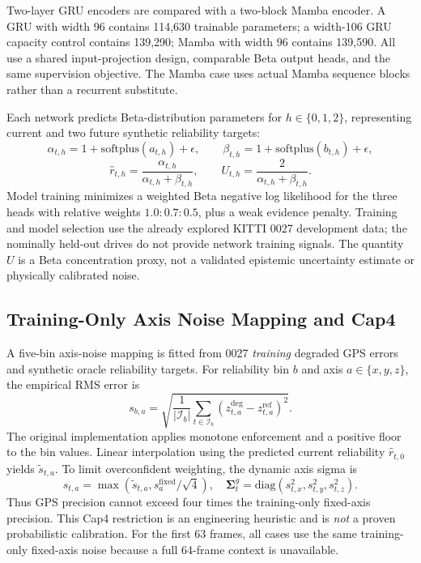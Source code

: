 Two-layer GRU encoders are compared with a two-block Mamba encoder.
A GRU with width 96 contains 114,630 trainable parameters;
a width-106 GRU capacity control contains 139,290; Mamba with
width 96 contains 139,590. All use a shared input-projection
design, comparable Beta output heads, and the same supervision
objective. The Mamba case uses actual Mamba sequence blocks
rather than a recurrent substitute.

Each network predicts Beta-distribution parameters for
$h\in\{0,1,2\}$, representing current and two future
synthetic reliability targets:
\begin{equation}
\alpha_{t,h}=1+\mathrm{softplus}(a_{t,h})+\epsilon,\qquad
\beta_{t,h}=1+\mathrm{softplus}(b_{t,h})+\epsilon,
\end{equation}
\begin{equation}
\hat r_{t,h}=
\frac{\alpha_{t,h}}{\alpha_{t,h}+\beta_{t,h}},\qquad
U_{t,h}=\frac{2}{\alpha_{t,h}+\beta_{t,h}}.
\label{eq:v7_reliability}
\end{equation}
Model training minimizes a weighted Beta negative log likelihood
for the three heads with relative weights $1.0:0.7:0.5$, plus
a weak evidence penalty. Training and model selection use the
already explored KITTI 0027 development data; the nominally
held-out drives do not provide network training signals.
The quantity $U$ is a Beta concentration proxy, not a validated
epistemic uncertainty estimate or physically calibrated noise.

\subsection{Training-Only Axis Noise Mapping and Cap4}
A five-bin axis-noise mapping is fitted from 0027
\emph{training} degraded GPS errors and synthetic oracle
reliability targets. For reliability bin $b$ and
axis $a\in\{x,y,z\}$, the empirical RMS error is
\begin{equation}
s_{b,a}=\sqrt{\frac{1}{|\mathcal I_b|}
\sum_{t\in\mathcal I_b}
(z^{\mathrm{deg}}_{t,a}-z^{\mathrm{ref}}_{t,a})^2}.
\label{eq:v7_axisfit}
\end{equation}
The original implementation applies monotone enforcement
and a positive floor to the bin values.
Linear interpolation using the predicted current reliability
$\hat r_{t,0}$ yields $\tilde s_{t,a}$. To limit
overconfident weighting, the dynamic axis sigma is
\begin{equation}
s_{t,a}=\max\left(
\tilde s_{t,a},
s_a^{\mathrm{fixed}}/\sqrt{4}\right),\quad
\mathbf{\Sigma}^{g}_t=
\mathrm{diag}(s_{t,x}^2,s_{t,y}^2,s_{t,z}^2).
\label{eq:v7_cap4}
\end{equation}
Thus GPS precision cannot exceed four times the
training-only fixed-axis precision. This Cap4
restriction is an engineering heuristic and is
\emph{not} a proven probabilistic calibration.
For the first 63 frames, all cases use the same
training-only fixed-axis noise because a full
64-frame context is unavailable.

